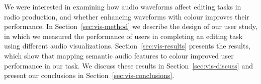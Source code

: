 
We were interested in examining how audio waveforms affect editing tasks in radio production, and whether enhancing
waveforms with colour improves their performance. In Section~\ref{sec:vis-method} we describe the design of our user
study, in which we measured the performance of users in completing an editing task using different audio
visualizations. Section~\ref{sec:vis-results} presents the results, which show that mapping semantic audio features to
colour improved user performance in our task. We discuss these results in Section~\ref{sec:vis-discuss} and present our
conclusions in Section~\ref{sec:vis-conclusions}.






